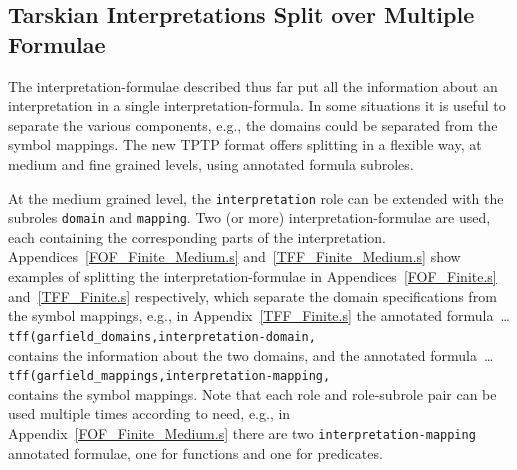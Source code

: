 \documentclass{easychair}
\newcommand{\smalltt}[1]{\small \texttt{#1}}
\begin{document}
\subsection{Tarskian Interpretations Split over Multiple Formulae}
\label{NewTarskianSplit}

The interpretation-formulae described thus far put all the information about an interpretation 
in a single interpretation-formula.
In some situations it is useful to separate the various components, e.g., the domains could be
separated from the symbol mappings.
The new TPTP format offers splitting in a flexible way, at medium and fine grained levels, using 
annotated formula subroles.

At the medium grained level, the {\tt interpretation} role can be extended with the subroles
{\tt domain} and {\tt mapping}.
Two (or more) interpretation-formulae are used, each containing the corresponding parts of the 
interpretation.
Appendices~\ref{FOF_Finite_Medium.s} and~\ref{TFF_Finite_Medium.s} show examples of
splitting the interpretation-formulae in Appendices~\ref{FOF_Finite.s} and~\ref{TFF_Finite.s} 
respectively, which separate the domain specifications from the symbol mappings, e.g., in 
Appendix~\ref{TFF_Finite.s} the annotated formula~\ldots \\
\hspace*{1.0em}\smalltt{tff(garfield\_domains,interpretation-domain,} \\
contains the information about the two domains, and the annotated formula~\ldots \\
\hspace*{1.0em}\smalltt{tff(garfield\_mappings,interpretation-mapping,} \\
contains the symbol mappings.
Note that each role and role-subrole pair can be used multiple times according to need, e.g.,
in Appendix~\ref{FOF_Finite_Medium.s} there are two {\tt interpretation-mapping} annotated
formulae, one for functions and one for predicates.
\end{document}
